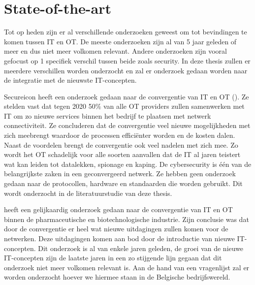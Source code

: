 
\section{State-of-the-art}
\label{sec:state-of-the-art}

Tot op heden zijn er al verschillende onderzoeken geweest om tot bevindingen te komen tussen IT en OT. De meeste onderzoeken zijn al van 5 jaar geleden of meer en dus niet meer volkomen relevant. Andere onderzoeken zijn vooral gefocust op 1 specifiek verschil tussen beide zoals security. In deze thesis zullen er meerdere verschillen worden onderzocht en zal er onderzoek gedaan worden naar de integratie met de nieuwste IT-concepten.


Secureicon heeft een onderzoek gedaan naar de convergentie van IT en OT (\cite{SecureiconTeam2019}). Ze stelden vast dat tegen 2020 50\% van alle OT providers zullen samenwerken met IT om zo nieuwe services binnen het bedrijf te plaatsen met netwerk connectiviteit. Ze concluderen dat de convergentie veel nieuwe mogelijkheden met zich meebrengt waardoor de processen efficiënter worden en de kosten dalen. Naast de voordelen brengt de convergentie ook veel nadelen met zich mee. Zo wordt het OT schadelijk voor alle soorten aanvallen dat de IT al jaren teistert wat kan leiden tot datalekken, spionage en kaping. De cybersecurity is één van de belangrijkste zaken in een geconvergeerd netwerk. Ze hebben geen onderzoek gedaan naar de protocollen, hardware en standaarden die worden gebruikt. Dit wordt onderzocht in de literatuurstudie van deze thesis. 


\textcite{Pennerad2013} heeft een gelijkaardig onderzoek gedaan naar de convergentie van IT en OT binnen de pharmaceutische en biotechnologische industrie. Zijn conclusie was dat door de convergentie er heel wat nieuwe uitdagingen zullen komen voor de netwerken. Deze uitdagingen komen aan bod door de introductie van nieuwe IT-concepten. Dit onderzoek is al van enkele jaren geleden, de groei van de nieuwe IT-concepten zijn de laatste jaren in een zo stijgende lijn gegaan dat dit onderzoek niet meer volkomen relevant is. Aan de hand van een vragenlijst zal er worden onderzocht hoever we hiermee staan in de Belgische bedrijfswereld. 










